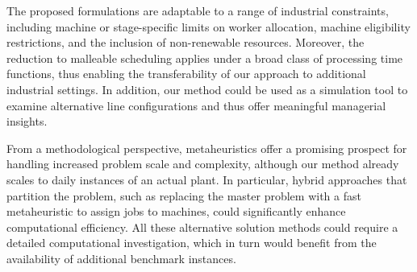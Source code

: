 \documentclass[a4paper,final]{article}
\begin{document}
 The proposed formulations are adaptable to a range of industrial constraints, including machine or stage-specific limits on worker allocation, machine eligibility restrictions, and the inclusion of non-renewable resources. Moreover, the reduction to malleable scheduling applies under a broad class of processing time functions, thus enabling the transferability of our approach to additional industrial settings. In addition, our method could be used as a simulation tool to examine alternative line configurations and thus offer meaningful managerial insights.

From a methodological perspective, metaheuristics offer a promising prospect for handling increased problem scale and complexity, although our method already scales to daily instances of an actual plant. In particular, hybrid approaches that partition the problem, such as replacing the master problem with a fast metaheuristic to assign jobs to machines, could significantly enhance computational efficiency. All these alternative solution methods could require a detailed computational investigation, which in turn would benefit from the availability of additional benchmark instances.
    



\printbibliography
\pagebreak
\end{document}
